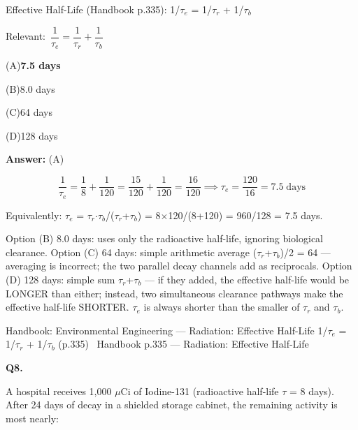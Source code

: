 \documentclass[11pt]{article}
\newcommand{\correct}[1]{\textbf{#1}\;{\color{accent}$\checkmark$}}
\newcommand{\optline}[2]{\par\noindent\hspace{1.2em}(#1)\hspace{0.6em}#2}
\begin{document}
Effective Half-Life (Handbook p.335):
1/$\tau_e$ = 1/$\tau_r$ + 1/$\tau_b$\par\vspace{3pt}
{\small\color{soft}Relevant:}\ $\dfrac{1}{\tau_e} = \dfrac{1}{\tau_r} + \dfrac{1}{\tau_b}$\par\vspace{3pt}
\optline{A}{\correct{7.5 days}}
\optline{B}{8.0 days}
\optline{C}{64 days}
\optline{D}{128 days}
\par\vspace{3pt}
\vspace{2pt}\par\noindent\colorbox{boxbg}{\parbox{\dimexpr\linewidth-2\fboxsep\relax}{%
\vspace{2pt}\textbf{Answer:} (A)\par\vspace{2pt}
{\small \[\frac{1}{\tau_e} = \frac{1}{8} + \frac{1}{120} = \frac{15}{120} + \frac{1}{120} = \frac{16}{120} \implies \tau_e = \frac{120}{16} = 7.5\;\text{days}\]

Equivalently: $\tau_e$ = $\tau_r$$\cdot$$\tau_b$/($\tau_r$+$\tau_b$) = 8$\times$120/(8+120) = 960/128 = 7.5 days.

Option (B) 8.0 days: uses only the radioactive half-life, ignoring biological clearance. Option (C) 64 days: simple arithmetic average ($\tau_r$+$\tau_b$)/2 = 64 --- averaging is incorrect; the two parallel decay channels add as reciprocals. Option (D) 128 days: simple sum $\tau_r$+$\tau_b$ --- if they added, the effective half-life would be LONGER than either; instead, two simultaneous clearance pathways make the effective half-life SHORTER. $\tau_e$ is always shorter than the smaller of $\tau_r$ and $\tau_b$.}\par\vspace{2pt}
{\footnotesize\color{soft}Handbook: Environmental Engineering --- Radiation: Effective Half-Life 1/$\tau_e$ = 1/$\tau_r$ + 1/$\tau_b$ (p.335) \textbullet\ Handbook p.335 --- Radiation: Effective Half-Life}\vspace{2pt}
}}
\vspace{9pt}
\filbreak
\textbf{\color{accent}Q8.}\par\vspace{2pt}
A hospital receives 1,000 $\mu$Ci of Iodine-131 (radioactive half-life $\tau$ = 8 days). After 24 days of decay in a shielded storage cabinet, the remaining activity is most nearly:
\end{document}
